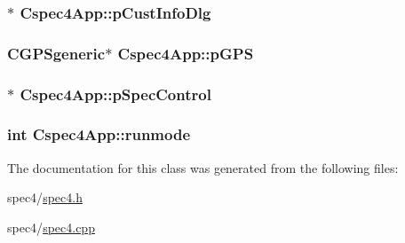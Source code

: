 \label{classCspec4App_a06bded385a1b1084d5c65725c7509b88}
\hypertarget{classCspec4App_a2792961deb5902f72c5b8fa7a756b746}{
\subsubsection[{pCustInfoDlg}]{$\ast$ {\bf Cspec4App::pCustInfoDlg}}}
\label{classCspec4App_a2792961deb5902f72c5b8fa7a756b746}
\hypertarget{classCspec4App_af3740e495567311821ca3b8fbe0f10aa}{
\subsubsection[{pGPS}]{\setlength{\rightskip}{0pt plus 5cm}CGPSgeneric$\ast$ {\bf Cspec4App::pGPS}}}
\label{classCspec4App_af3740e495567311821ca3b8fbe0f10aa}
\hypertarget{classCspec4App_af9eab90ef7c5bb800561169d2165fce9}{
\subsubsection[{pSpecControl}]{$\ast$ {\bf Cspec4App::pSpecControl}}}
\label{classCspec4App_af9eab90ef7c5bb800561169d2165fce9}
\hypertarget{classCspec4App_a787077381a3617938ae9761f2aa39a1e}{
\subsubsection[{runmode}]{\setlength{\rightskip}{0pt plus 5cm}int {\bf Cspec4App::runmode}}}
\label{classCspec4App_a787077381a3617938ae9761f2aa39a1e}


The documentation for this class was generated from the following files:\begin{DoxyCompactItemize}
\item 
spec4/\hyperlink{spec4_8h}{spec4.h}\item 
spec4/\hyperlink{spec4_8cpp}{spec4.cpp}\end{DoxyCompactItemize}
